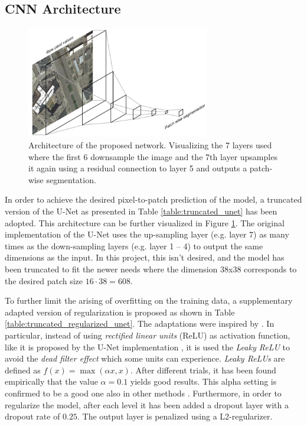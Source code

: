 \documentclass[10pt,conference,compsocconf]{IEEEtran}
\begin{document}
\subsection{CNN Architecture}\label{architectures}

\begin{figure}
\includegraphics[width={8cm}]{network-visualisation}
\caption{Architecture of the proposed network. Visualizing the 7 layers used where the first 6 downsample the image and the 7th layer upsamples it again using a residual connection to layer 5 and outputs a patch-wise segmentation.}
\label{fig:architecture}
\end{figure}

In order to achieve the desired pixel-to-patch prediction of the model, a truncated version of the U-Net \cite{Ronneberger2015} as presented in Table \ref{table:truncated_unet} has been adopted. This architecture can be further visualized in Figure \ref{fig:architecture}. The original implementation of the U-Net uses the up-sampling layer (e.g. layer 7) as many times as the down-sampling layers (e.g. layer 1 – 4) to output the same dimensions as the input. In this project, this isn't desired, and the model has been truncated to fit the newer needs where the dimension 38x38 corresponds to the desired patch size $16 \cdot 38 = 608$.

To further limit the arising of overfitting on the training data, a supplementary adapted version of regularization is proposed as shown in Table \ref{table:truncated_regularized_unet}. The adaptations were inspired by \cite{Pavllo2017}. In particular, instead of using \textit{rectified linear units} (ReLU) as activation function, like it is proposed by the U-Net implementation \cite{Ronneberger2015}, it is used the \textit{Leaky ReLU} to avoid the \textit{dead filter effect} which some units can experience. \textit{Leaky ReLUs} are defined as $f(x) = \max(\alpha x, x)$. After different trials, it has been found empirically that the value $\alpha=0.1$ yields good results. This alpha setting is confirmed to be a good one also in other methods \cite{Pavllo2017}. Furthermore, in order to regularize the model, after each level it has been added a dropout layer with a dropout rate of $0.25$. The output layer is penalized using a L2-regularizer.
\end{document}
